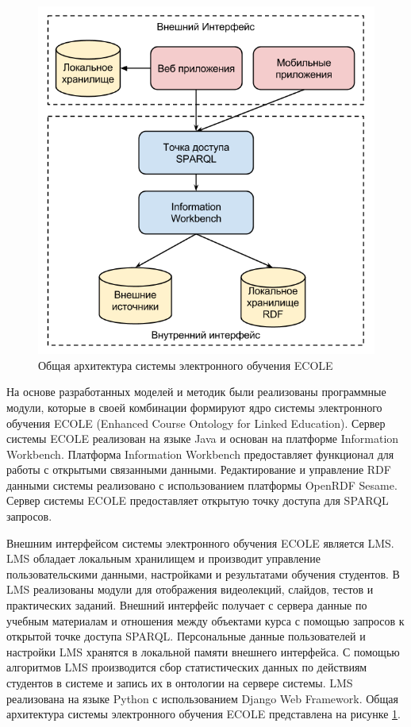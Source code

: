 \begin{figure}[ht] 
  \center
  \includegraphics[scale=0.40]{OverallArch}
  \caption{Общая архитектура системы электронного обучения ECOLE} 
  \label{fig:OverallArch}
\end{figure}


На основе разработанных моделей и методик были реализованы программные модули, которые в своей комбинации формируют ядро системы электронного обучения ECOLE (Enhanced Course Ontology for Linked Education). Сервер системы ECOLE реализован на языке Java и основан на платформе Information Workbench. Платформа Information Workbench предоставляет функционал для работы с открытыми связанными данными. Редактирование и управление RDF данными системы реализовано с использованием платформы OpenRDF Sesame. Сервер системы ECOLE предоставляет открытую точку доступа для SPARQL запросов. 

Внешним интерфейсом системы электронного обучения ECOLE является LMS. LMS обладает локальным хранилищем и производит управление пользовательскими данными, настройками и результатами обучения студентов. В LMS реализованы модули для отображения видеолекций, слайдов, тестов и практических заданий. Внешний интерфейс получает с сервера данные по учебным материалам и отношения между объектами курса с помощью запросов к открытой точке доступа SPARQL. Персональные данные пользователей и настройки LMS хранятся в локальной памяти внешнего интерфейса. С помощью алгоритмов LMS производится сбор статистических данных по действиям студентов в системе и запись их в онтологии на сервере системы. LMS реализована на языке Python с использованием Django Web Framework. Общая архитектура системы электронного обучения ECOLE представлена на рисунке \ref{fig:OverallArch}.




